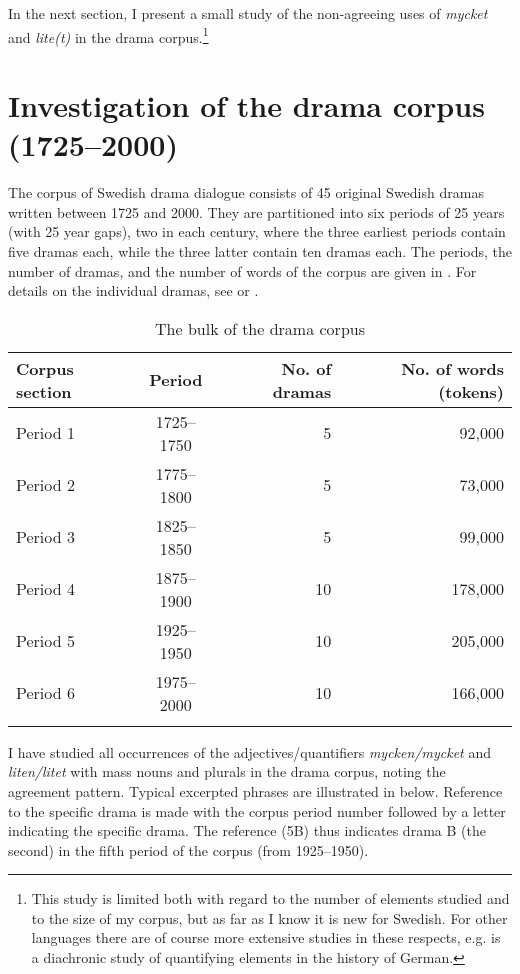 \documentclass[output=paper]{langscibook}
\begin{document}
In the next section, I present a small study of the non-agreeing uses of \textit{mycket} and \textit{lite(t)} in the drama corpus.\footnote{This study is limited both with regard to the number of elements studied and to the size of my corpus, but as far as I know it is new for Swedish. For other languages there are of course more extensive studies in these respects, e.g. \citet{RoehrsSapp2016} is a diachronic study of quantifying elements in the history of German.} 


\section{Investigation of the drama corpus (1725–2000)}\label{sec:delsing:3}


The corpus of Swedish drama dialogue consists of 45 original Swedish dramas written between 1725 and 2000. They are partitioned into six periods of 25 years (with 25 year gaps), two in each century, where the three earliest periods contain five dramas each, while the three latter contain ten dramas each. The periods, the number of dramas, and the number of words of the corpus are given in . For details on the individual dramas, see \citet{MarttalaStromquist2001} or \citet[38–39 and Appendix 1]{Stroh-Wollin2008}.



\begin{table}
\caption{The bulk of the drama corpus\label{tab:delsing:2}}
\begin{tabular}{lcrr}
\lsptoprule
Corpus section & Period & No. of dramas & No. of words (tokens)\\
\midrule
Period 1 & 1725–1750 & 5 & 92,000\\
Period 2 & 1775–1800 & 5 & 73,000\\
Period 3 & 1825–1850 & 5 & 99,000\\
Period 4 & 1875–1900 & 10 & 178,000\\
Period 5 & 1925–1950 & 10 & 205,000\\
Period 6 & 1975–2000 & 10 & 166,000\\
\lspbottomrule
\end{tabular}
\end{table}

I have studied all occurrences of the adjectives/quantifiers \textit{mycken/mycket} and \textit{liten/litet} with mass nouns and plurals in the drama corpus, noting the agreement pattern. Typical excerpted phrases are illustrated in  below. Reference to the specific drama is made with the corpus period number followed by a letter indicating the specific drama. The reference (5B) thus indicates drama B (the second) in the fifth period of the corpus (from 1925–1950).
\end{document}
